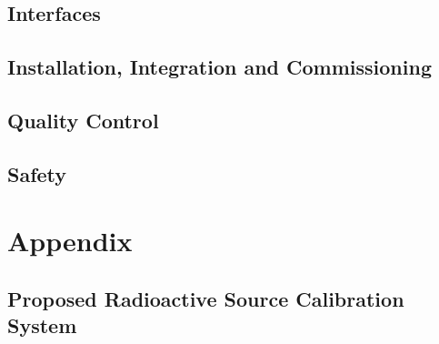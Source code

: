 \subsection{Interfaces}
\label{sec:dp-calib-intfc}

\subsection{Installation, Integration and Commissioning}
\label{sec:dp-calib-iic}

\subsection{Quality Control}
\label{sec:dp-calib-qc}

\subsection{Safety}
\label{sec:dp-calib-safe}

\newpage


\section{Appendix}
%

\subsection{Proposed Radioactive Source Calibration System}
\label{sec:dp-calib-sys-rsds}


